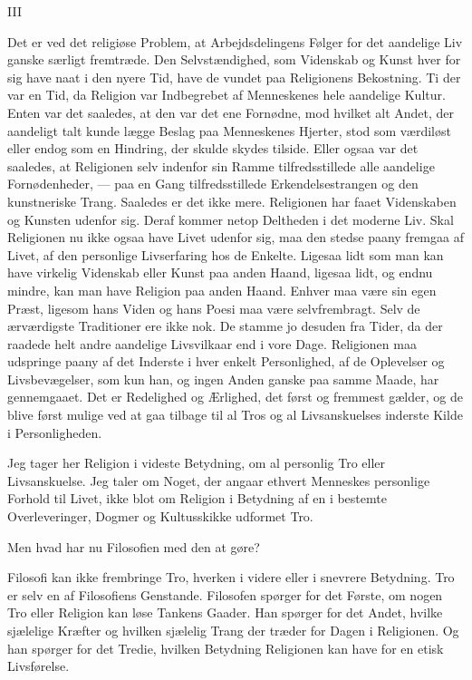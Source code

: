 \documentclass[12pt,a4paper,openany]{book}
\newcommand{\opage}[1]{\marginnote{\footnotesize\textit{[#1]}}}
\begin{document}
\begin{center}III\end{center}


Det er ved det religiøse Problem, at Arbejdsdelingens
Følger for det aandelige Liv ganske særligt fremtræde. Den
Selvstændighed, som Videnskab og Kunst hver for sig have
naat i den nyere Tid, have de vundet paa Religionens Bekostning.
Ti der var en Tid, da Religion var Indbegrebet af Menneskenes
hele aandelige Kultur. Enten var det saaledes, at
den var det ene Fornødne, mod hvilket alt Andet, der aandeligt
talt kunde lægge Beslag paa Menneskenes Hjerter, stod som
værdiløst eller endog som en Hindring, der skulde skydes tilside.
Eller ogsaa var det saaledes, at Religionen selv indenfor
sin Ramme tilfredsstillede alle aandelige Fornødenheder, --- paa
en Gang tilfredsstillede Erkendelsestrangen og den kunstneriske
Trang. Saaledes er det ikke mere. Religionen har faaet Videnskaben
og Kunsten udenfor sig. Deraf kommer netop Deltheden
i det moderne Liv. Skal Religionen nu ikke ogsaa
have Livet udenfor sig, maa den stedse paany fremgaa af Livet,
af den personlige Livserfaring hos de Enkelte. Ligesaa lidt
som man kan have virkelig Videnskab eller Kunst paa anden
Haand, ligesaa lidt, og endnu mindre, kan man have Religion
paa anden Haand. Enhver maa være sin egen Præst, ligesom
hans Viden og hans Poesi maa være selvfrembragt. Selv de ærværdigste
Traditioner ere ikke nok. De stamme jo desuden
fra Tider, da der raadede helt andre aandelige Livsvilkaar end
i vore Dage. Religionen maa udspringe paany af det Inderste
i hver enkelt Personlighed, af de Oplevelser og Livsbevægelser,
som kun han, og ingen Anden ganske paa samme Maade, har
gennemgaaet. Det er Redelighed og Ærlighed, det først og
fremmest gælder, og de blive først mulige ved at gaa tilbage
til al Tros og al Livsanskuelses inderste Kilde i Personligheden.


Jeg tager her Religion i videste Betydning, om al personlig
Tro eller Livsanskuelse. Jeg taler om Noget, der angaar ethvert
Menneskes personlige Forhold til Livet, ikke blot om
\setcounter{footnote}{0}%
\opage{13}Religion i Betydning af en i bestemte Overleveringer, Dogmer
og Kultusskikke udformet Tro.

Men hvad har nu Filosofien med den at gøre?

Filosofi kan ikke frembringe Tro, hverken i videre eller i
snevrere Betydning. Tro er selv en af Filosofiens Genstande.
Filosofen spørger for det Første, om nogen Tro eller Religion
kan løse Tankens Gaader. Han spørger for det Andet, hvilke
sjælelige Kræfter og hvilken sjælelig Trang der træder for
Dagen i Religionen. Og han spørger for det Tredie, hvilken
Betydning Religionen kan have for en etisk Livsførelse.
\end{document}
